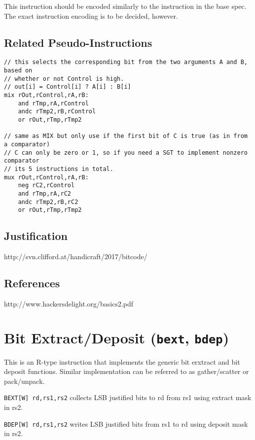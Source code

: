 This instruction should be encoded similarly to the instruction in the
base spec. The exact instruction encoding is to be decided, however.

\subsection{Related Pseudo-Instructions}

\begin{verbatim}
// this selects the corresponding bit from the two arguments A and B, based on
// whether or not Control is high.
// out[i] = Control[i] ? A[i] : B[i]
mix rOut,rControl,rA,rB:
    and rTmp,rA,rControl
    andc rTmp2,rB,rControl
    or rOut,rTmp,rTmp2

// same as MIX but only use if the first bit of C is true (as in from a comparator)
// C can only be zero or 1, so if you need a SGT to implement nonzero comparator
// its 5 instructions in total.
mux rOut,rControl,rA,rB:
    neg rC2,rControl
    and rTmp,rA,rC2
    andc rTmp2,rB,rC2
    or rOut,rTmp,rTmp2
\end{verbatim}

\subsection{Justification}

http://svn.clifford.at/handicraft/2017/bitcode/

\subsection{References}

http://www.hackersdelight.org/basics2.pdf


\section{Bit Extract/Deposit (\texttt{bext}, \texttt{bdep})}

This is an R-type instruction that implements the generic bit erxtract
and bit deposit functions. Similar implementation can be referred to as
gather/scatter or pack/unpack.

\texttt{BEXT[W] rd,rs1,rs2} collects LSB justified bits to rd from
rs1 using extract mask in rs2.

\texttt{BDEP[W] rd,rs1,rs2} writes LSB justified bits from rs1 to rd using
deposit mask in rs2.

